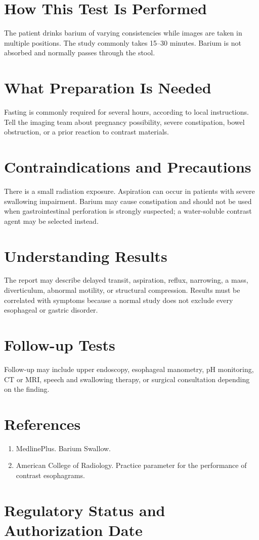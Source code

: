 \section*{How This Test Is Performed}
The patient drinks barium of varying consistencies while images are taken in multiple positions. The study commonly takes 15--30 minutes. Barium is not absorbed and normally passes through the stool.

\section*{What Preparation Is Needed}
Fasting is commonly required for several hours, according to local instructions. Tell the imaging team about pregnancy possibility, severe constipation, bowel obstruction, or a prior reaction to contrast materials.

\section*{Contraindications and Precautions}
There is a small radiation exposure. Aspiration can occur in patients with severe swallowing impairment. Barium may cause constipation and should not be used when gastrointestinal perforation is strongly suspected; a water-soluble contrast agent may be selected instead.

\section*{Understanding Results}
The report may describe delayed transit, aspiration, reflux, narrowing, a mass, diverticulum, abnormal motility, or structural compression. Results must be correlated with symptoms because a normal study does not exclude every esophageal or gastric disorder.

\section*{Follow-up Tests}
Follow-up may include upper endoscopy, esophageal manometry, pH monitoring, CT or MRI, speech and swallowing therapy, or surgical consultation depending on the finding.

\section*{References}
\begin{enumerate}
  \item MedlinePlus. Barium Swallow.
  \item American College of Radiology. Practice parameter for the performance of contrast esophagrams.
\end{enumerate}

\clearpage


\section*{Regulatory Status and Authorization Date}

\clearpage
